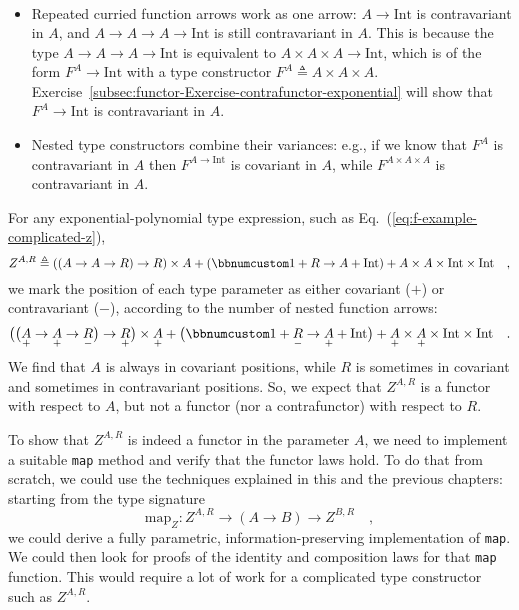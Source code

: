 \begin{itemize}
\begin{align*}
\end{align*}
\item Repeated curried function arrows work as one arrow: $A\rightarrow\text{Int}$
is contravariant in $A$, and $A\rightarrow A\rightarrow A\rightarrow\text{Int}$
is still contravariant in $A$. This is  because the type $A\rightarrow A\rightarrow A\rightarrow\text{Int}$
is equivalent to $A\times A\times A\rightarrow\text{Int}$, which
is of the form $F^{A}\rightarrow\text{Int}$ with a type constructor
$F^{A}\triangleq A\times A\times A$. Exercise~\ref{subsec:functor-Exercise-contrafunctor-exponential}
will show that $F^{A}\rightarrow\text{Int}$ is contravariant in $A$.
\item Nested type constructors combine their variances: e.g., if we know
that $F^{A}$ is contravariant in $A$ then $F^{A\rightarrow\text{Int}}$
is covariant in $A$, while $F^{A\times A\times A}$ is contravariant
in $A$.
\end{itemize}
For any exponential-polynomial type expression, such as Eq.~(\ref{eq:f-example-complicated-z}),
\[
Z^{A,R}\triangleq\left(\left(A\rightarrow A\rightarrow R\right)\rightarrow R\right)\times A+\left(\bbnum 1+R\rightarrow A+\text{Int}\right)+A\times A\times\text{Int}\times\text{Int}\quad,
\]
we mark the position of each type parameter as either covariant ($+$)
or contravariant ($-$), according to the number of nested function
arrows:
\[
\big(\big(\underset{+}{A}\rightarrow\underset{+}{A}\rightarrow\underset{-}{R}\big)\rightarrow\underset{+}{R}\big)\times\underset{+}{A}+\big(\bbnum 1+\underset{-}{R}\rightarrow\underset{+}{A}+\text{Int}\big)+\underset{+}{A}\times\underset{+}{A}\times\text{Int}\times\text{Int}\quad.
\]
We find that $A$ is always in covariant positions, while $R$ is
sometimes in covariant and sometimes in contravariant positions. So,
we expect that $Z^{A,R}$ is a functor with respect to $A$, but not
a functor (nor a contrafunctor) with respect to $R$.

To show that $Z^{A,R}$ is indeed a functor in the parameter $A$,
we need to implement a suitable \lstinline!map! method and verify
that the functor laws hold. To do that from scratch, we could use
the techniques explained in this and the previous chapters: starting
from the type signature 
\[
\text{map}_{Z}:Z^{A,R}\rightarrow\left(A\rightarrow B\right)\rightarrow Z^{B,R}\quad,
\]
we could derive a fully parametric, information-preserving implementation
of \lstinline!map!. We could then look for proofs of the identity
and composition laws for that \lstinline!map! function. This would
require a lot of work for a complicated type constructor such as $Z^{A,R}$.

